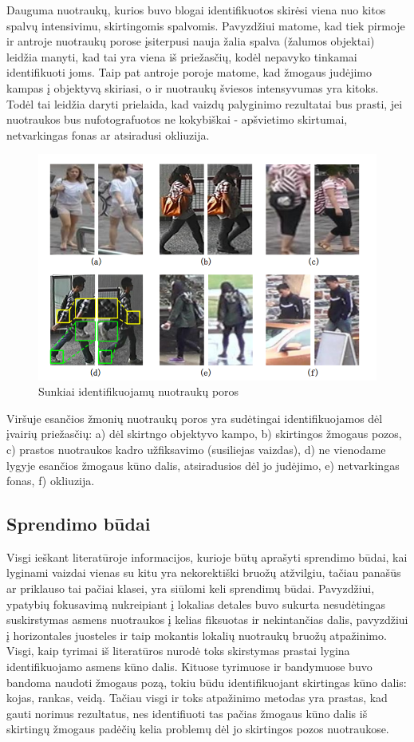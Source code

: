 \documentclass{VUMIFPSkursinis}
\begin{document}
Dauguma nuotraukų, kurios buvo blogai identifikuotos skirėsi viena nuo kitos spalvų intensivimu, skirtingomis spalvomis. Pavyzdžiui matome, kad tiek pirmoje ir antroje nuotraukų porose įsiterpusi nauja žalia spalva (žalumos objektai) leidžia manyti, kad tai yra viena iš priežasčių, kodėl nepavyko tinkamai identifikuoti joms. Taip pat antroje poroje matome, kad žmogaus judėjimo kampas į objektyvą skiriasi, o ir nuotraukų šviesos intensyvumas yra kitoks. Todėl tai leidžia daryti prielaida, kad vaizdų palyginimo rezultatai bus prasti, jei nuotraukos bus nufotografuotos ne kokybiškai - apšvietimo skirtumai, netvarkingas fonas ar atsiradusi okliuzija.

\begin{figure}[H]
\centering
\includegraphics[scale=1.0]{img/image_diff_examples.png}
\caption{Sunkiai identifikuojamų nuotraukų poros} %
\label{img:mlp}
\end{figure}
Viršuje esančios žmonių nuotraukų poros yra sudėtingai identifikuojamos dėl įvairių priežasčių: a) dėl skirtngo objektyvo kampo, b) skirtingos žmogaus pozos, c) prastos nuotraukos kadro užfiksavimo (susiliejas vaizdas), d) ne vienodame lygyje esančios žmogaus kūno dalis, atsiradusios dėl jo judėjimo, e) netvarkingas fonas, f) okliuzija.

\pagebreak
\subsection{Sprendimo būdai}
Visgi ieškant literatūroje informacijos, kurioje būtų aprašyti sprendimo būdai, kai lyginami vaizdai vienas su kitu yra nekorektiški bruožų atžvilgiu, tačiau panašūs ar priklauso tai pačiai klasei, yra siūlomi keli sprendimų būdai. Pavyzdžiui, ypatybių fokusavimą nukreipiant į lokalias detales buvo sukurta nesudėtingas suskirstymas asmens nuotraukos į kelias fiksuotas ir nekintančias dalis, pavyzdžiui į horizontales juosteles ir taip mokantis lokalių nuotraukų bruožų atpažinimo. Visgi, kaip tyrimai iš literatūros nurodė toks skirstymas prastai lygina identifikuojamo asmens kūno dalis. Kituose tyrimuose ir bandymuose buvo bandoma naudoti žmogaus pozą, tokiu būdu identifikuojant skirtingas kūno dalis: kojas, rankas, veidą. Tačiau visgi ir toks atpažinimo metodas yra prastas, kad gauti norimus rezultatus, nes identifiuoti tas pačias žmogaus kūno dalis iš skirtingų žmogaus padėčių kelia problemų dėl jo skirtingos pozos nuotraukose.
\pagebreak
\end{document}
